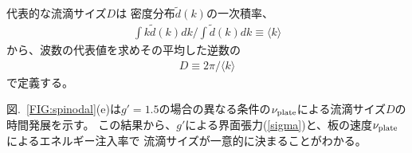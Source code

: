 \documentclass[12pt,a4paper]{jbook}
\begin{document}
        代表的な流滴サイズ$D$は
        密度分布$\tilde d(k)$の一次積率、
        \begin{eqnarray}
            \int k \tilde d(k) dk / \int \tilde d(k) dk \equiv \langle k \rangle
        \end{eqnarray}
        から、波数の代表値を求めその平均した逆数の
        \begin{eqnarray}
            D \equiv 2\pi / \langle k \rangle
        \end{eqnarray}
        で定義する。

        図.~\ref{FIG:spinodal}(e)は$g'=1.5$の場合の異なる条件の$\nu_{\rm plate}$による流滴サイズ$D$の時間発展を示す。
        この結果から、$g'$による界面張力(\ref{sigma})と、板の速度$\nu_{\rm plate}$によるエネルギー注入率で
        流滴サイズが一意的に決まることがわかる。

\end{document}
